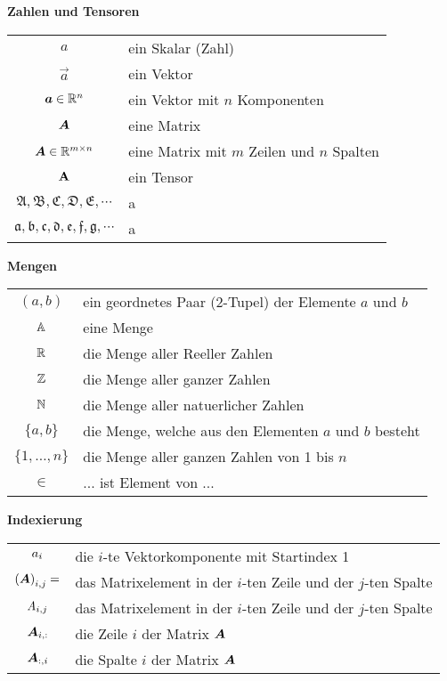 \begin{center}\textbf{Zahlen und Tensoren}\end{center}
\begin{tabular}{cl}
  $a$ & ein Skalar (Zahl) \\
  $\vec{a}$ & ein Vektor \\
  $\bm{a} \in \mathbb{R}^{n}$ & ein Vektor mit $n$ Komponenten \\
  $\bm{A}$ & eine Matrix \\
  $\bm{A} \in \mathbb{R}^{m \times n}$ & eine Matrix mit $m$ Zeilen und $n$ Spalten \\
  $\mathbf{A}$ & ein Tensor \\
  $\mathfrak{A,B,C,D,E,\cdots}$ & a \\
  $\mathfrak{a,b,c,d,e,f,g,\cdots}$ & a \\


\end{tabular}

\begin{center}\textbf{Mengen}\end{center}
\begin{tabular}{cl}
  $(a,b)$ & ein geordnetes Paar (2-Tupel) der Elemente $a$ und $b$ \\
  $\mathbb{A}$ & eine Menge \\
  $\mathbb{R}$ & die Menge aller Reeller Zahlen \\
  $\mathbb{Z}$ & die Menge aller ganzer Zahlen \\
  $\mathbb{N}$ & die Menge aller natuerlicher Zahlen \\
  $\{a,b\}$ & die Menge, welche aus den Elementen $a$ und $b$ besteht \\
  $\{1,\ldots,n\}$ & die Menge aller ganzen Zahlen von 1 bis $n$ \\
  $\in$ & ... ist Element von ...

\end{tabular}

\begin{center}\textbf{Indexierung}\end{center}
\begin{tabular}{cl}
  $a_i$ & die $i$-te Vektorkomponente mit Startindex 1 \\
  ${(\bm{A})}_{i,j} = $ & das Matrixelement in der $i$-ten Zeile und der $j$-ten Spalte \\
  $\mathit{A}_{i,j}$ & das Matrixelement in der $i$-ten Zeile und der $j$-ten Spalte \\
  $\bm{A}_{i,:}$ & die Zeile $i$ der Matrix $\bm{A}$ \\
  $\bm{A}_{:,i}$ & die Spalte $i$ der Matrix $\bm{A}$\ \\

\end{tabular}


